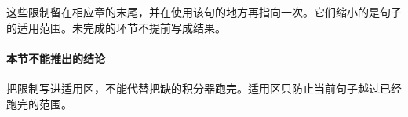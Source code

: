 这些限制留在相应章的末尾，并在使用该句的地方再指向一次。它们缩小的是句子的适用范围。未完成的环节不提前写成结果。

\paragraph{本节不能推出的结论}
把限制写进适用区，不能代替把缺的积分器跑完。适用区只防止当前句子越过已经跑完的范围。
